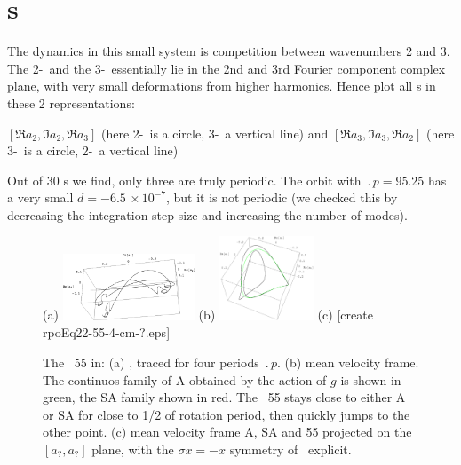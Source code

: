 %

\section{\Rpo s}

The dynamics in this small system is competition between wavenumbers
2 and 3. The 2-\eqv\  and the 3-\eqv\  essentially lie in
the 2nd and 3rd Fourier component complex plane, with very
small deformations from higher harmonics.
Hence plot all \rpo s in these 2 representations:

$[ \Re a_2, \Im a_2, \Re a_3 ]$
(here 2-\eqv\  is a circle, 3-\eqv\ a vertical line)
 and
$[ \Re a_3, \Im a_3, \Re a_2 ]$
(here 3-\eqv\ is a circle, 2-\eqv\ a vertical line)

%
Out of 30 \rpo s we
find,  only three are truly periodic.  The orbit
with $\period{p} = 95.25$ has a very small
$d = -6.5\,\times 10^{-7}$, but it is not periodic 
(we
checked this by decreasing the integration step size and increasing the
number of modes).


\begin{figure}[t] \label{f:rpo55}
\begin{center} 
(a) \includegraphics[width=0.35\textwidth]{figs/rpo22-55-4-clean.eps}
(b) \includegraphics[width=0.25\textwidth]{figs/rpoEq22-55-4-cm.eps}
(c) [create rpoEq22-55-4-cm-?.eps]
\end{center}
\caption{
 The \rpo\ {\nameit}55 in: 
 (a) \Statesp, traced for four periods $\period{p}$.
 (b) mean velocity frame. 
        The continuos family of 
    {\eqva} A obtained by the action of $g$ is shown in green,
    the SA family shown in red. The \rpo\ {\nameit}55 stays close
    to either A or SA for close to 1/2 of {\eqv} rotation
    period, then quickly jumps to the other {\eqv} point.
 (c) mean velocity frame A, SA and {\nameit}55 projected on the 
    $[a_?,a_?]$ plane,
    with the $\sigma x = -x$ symmetry of \KSe\ explicit.
        }
\end{figure}



